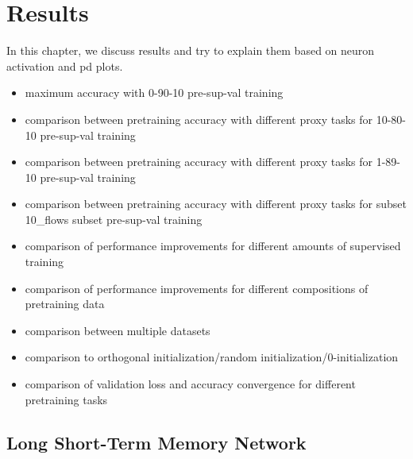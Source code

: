 \chapter{Results} \label{sec:results}

In this chapter, we discuss results and try to explain them based on neuron activation and \gls{pd} plots.

\begin{itemize}
	\item maximum accuracy with 0-90-10 pre-sup-val training
	\item comparison between pretraining accuracy with different proxy tasks for 10-80-10 pre-sup-val training
	\item comparison between pretraining accuracy with different proxy tasks for 1-89-10 pre-sup-val training
	\item comparison between pretraining accuracy with different proxy tasks for subset 10\_flows subset pre-sup-val training
	\item comparison of performance improvements for different amounts of supervised training
	\item comparison of performance improvements for different compositions of pretraining data
	\item comparison between multiple datasets
	\item comparison to orthogonal initialization/random initialization/0-initialization
	\item comparison of validation loss and accuracy convergence for different pretraining tasks
\end{itemize} 

\section{Long Short-Term Memory Network} \label{sec:results:lstm}

